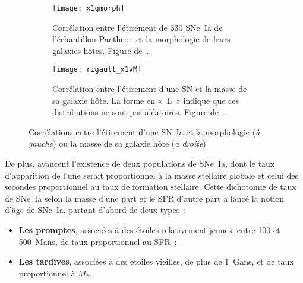 \documentclass[../main/main.tex]{subfiles}
\begin{document}
\begin{figure}[ht]
    \centering
    \begin{subfigure}[c]{.48\linewidth}
        \centering
        \texttt{[image: x1gmorph]}
        \caption[Corrélation entre l'étirement des SNe~Ia et la morphologie de
        leurs galaxies hôtes]{Corrélation entre l'étirement de 330 SNe~Ia de
            l'échantillon Pantheon \citep{scolnic2018} et la morphologie de
        leurs galaxies hôtes. Figure de~\cite{pruzhinskaya2020}.}
        \label{fig:x1gmorph}
    \end{subfigure}
    \hfill
    \begin{subfigure}[c]{.48\linewidth}
        \centering
        \texttt{[image: rigault\_x1vM]}
        \caption[Corrélation entre l'étirement d'une SN et la masse de sa
        galaxie hôte]{Corrélation entre l'étirement d'une SN et la masse de sa
            galaxie hôte. La forme en «~L~» indique que ces distributions ne
        sont pas aléatoires. Figure de~\cite{rigault2013}.}
        \label{fig:mcorrx1}
    \end{subfigure}
    \caption[Corrélations entre l'étirement d'une SN~Ia et la morphologie ou la
    masse de sa galaxie hôte]{Corrélations entre l'étirement d'une SN~Ia et la
        morphologie (\textit{à gauche}) ou la masse de sa galaxie hôte
    (\textit{à droite})}
    \label{fig:x1corrs}
\end{figure}

De plus, \cite{mannucci2005, scannapieco2005, sullivan2006} avancent l'existence
de deux populations de SNe~Ia, dont le taux d'apparition de l'une serait
proportionnel à la masse stellaire globale et celui des secondes proportionnel
au taux de formation stellaire. Cette dichotomie de taux de SNe~Ia selon la
masse d'une part et le SFR d'autre part a lancé la notion d'âge de SNe~Ia,
partant d'abord de deux types~:
\begin{itemize}
    \item \textbf{Les promptes}, associées à des étoiles relativement jeunes,
        entre \num{100} et \SI{500}{Mans}, de taux proportionnel au SFR~;
    \item \textbf{Les tardives}, associées à des étoiles vieilles, de plus de
        \SI{1}{Gans}, et de taux proportionnel à $M_*$.
\end{itemize}
\end{document}
